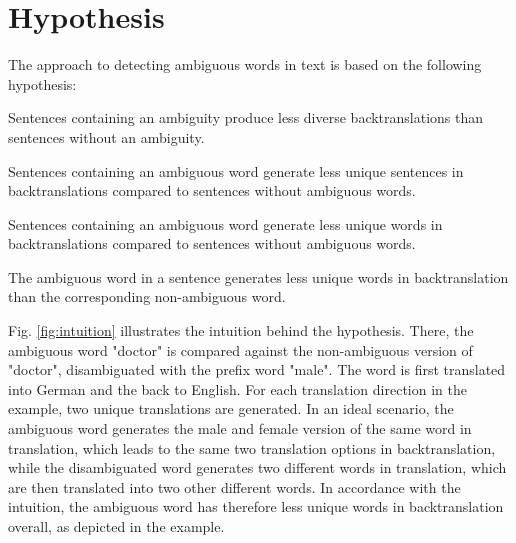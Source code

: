 \section{Hypothesis}
\label{sec:Methodology:Hypothesis}
The approach to detecting ambiguous words in text is based on the following hypothesis:

\begin{hyp}\label{main}
Sentences containing an ambiguity produce less diverse backtranslations than sentences without an ambiguity.
\end{hyp}

\setcounter{subhyp}{0}


\begin{subhyp}\label{a}
Sentences containing an ambiguous word generate less unique sentences in backtranslations compared to sentences without ambiguous words.
\end{subhyp}

\begin{subhyp}\label{b}
Sentences containing an ambiguous word generate less unique words in backtranslations compared to sentences without ambiguous words.
\end{subhyp}

\begin{subhyp}\label{c}
The ambiguous word in a sentence generates less unique words in backtranslation than the corresponding non-ambiguous word.
\end{subhyp}



Fig. \ref{fig:intuition} illustrates the intuition behind the hypothesis. There, the ambiguous word "doctor" is compared against the non-ambiguous version of "doctor", disambiguated with the prefix word "male". The word is first translated into German and the back to English. For each translation direction in the example, two unique translations are generated. In an ideal scenario, the ambiguous word generates the male and female version of the same word in translation, which leads to the same two translation options in backtranslation, while the disambiguated word generates two different words in translation, which are then translated into two other different words. In accordance with the intuition, the ambiguous word has therefore less unique words in backtranslation overall, as depicted in the example.

